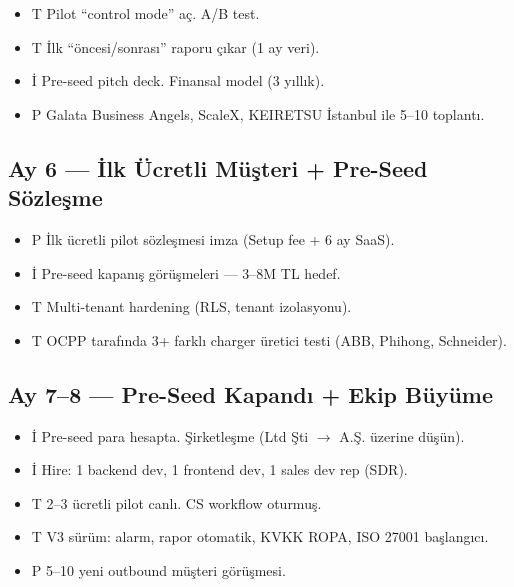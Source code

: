 \documentclass[11pt,a4paper]{article}
\begin{document}
\begin{itemize}
    \item {\color{blue!50!black}T} Pilot ``control mode'' aç. A/B test.
    \item {\color{blue!50!black}T} İlk ``öncesi/sonrası'' raporu çıkar (1 ay veri).
    \item {\color{red!50!black}İ} Pre-seed pitch deck. Finansal model (3 yıllık).
    \item {\color{green!50!black}P} Galata Business Angels, ScaleX, KEIRETSU İstanbul ile 5--10 toplantı.
\end{itemize}

\subsection*{Ay 6 — İlk Ücretli Müşteri + Pre-Seed Sözleşme}

\begin{itemize}
    \item {\color{green!50!black}P} İlk ücretli pilot sözleşmesi imza (Setup fee + 6 ay SaaS).
    \item {\color{red!50!black}İ} Pre-seed kapanış görüşmeleri --- 3--8M TL hedef.
    \item {\color{blue!50!black}T} Multi-tenant hardening (RLS, tenant izolasyonu).
    \item {\color{blue!50!black}T} OCPP tarafında 3+ farklı charger üretici testi (ABB, Phihong, Schneider).
\end{itemize}

\subsection*{Ay 7--8 — Pre-Seed Kapandı + Ekip Büyüme}

\begin{itemize}
    \item {\color{red!50!black}İ} Pre-seed para hesapta. Şirketleşme (Ltd Şti $\rightarrow$ A.Ş. üzerine düşün).
    \item {\color{red!50!black}İ} Hire: 1 backend dev, 1 frontend dev, 1 sales dev rep (SDR).
    \item {\color{blue!50!black}T} 2--3 ücretli pilot canlı. CS workflow oturmuş.
    \item {\color{blue!50!black}T} V3 sürüm: alarm, rapor otomatik, KVKK ROPA, ISO 27001 başlangıcı.
    \item {\color{green!50!black}P} 5--10 yeni outbound müşteri görüşmesi.
\end{itemize}
\end{document}

